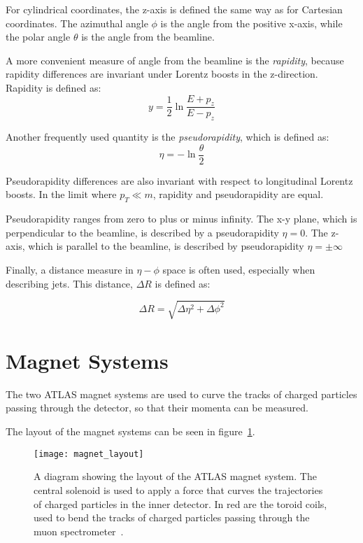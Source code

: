 For cylindrical coordinates, the z-axis is defined the same way as for
Cartesian coordinates. The azimuthal angle $\phi$ is the angle
from the positive x-axis, while the polar angle $\theta$ is the angle
from the beamline.

A more convenient measure of angle from the beamline is the
\textit{rapidity}, because rapidity differences are invariant under Lorentz boosts in the
z-direction.
Rapidity is defined as:
\begin{equation}
y = \frac{1}{2}\ln\frac{E+p_z}{E-p_z}
\end{equation}

Another frequently used quantity is the
\textit{pseudorapidity}, which is defined as:
\begin{equation}
\eta = -\ln\frac{\theta}{2}
\end{equation}

Pseudorapidity differences are also invariant with respect to
longitudinal Lorentz boosts. In the limit where $p_T \ll m$, rapidity and
pseudorapidity are equal.

Pseudorapidity ranges from zero to plus or minus infinity.
The x-y plane, which is perpendicular to the beamline, is described by a pseudorapidity $\eta=0$.
The z-axis, which is parallel to the beamline, is described by pseudorapidity $\eta=\pm\infty$

Finally, a distance measure in $\eta-\phi$ space is often used, especially when describing jets.
This distance, $\Delta R$ is defined as:

\begin{equation}
\Delta R = \sqrt{\Delta\eta^2+\Delta\phi^2}
\end{equation}

\section{Magnet Systems}\label{sec:magnet_systems}
The two ATLAS magnet systems are used to curve the tracks of charged particles passing through the detector,
so that their momenta can be measured.

The layout of the magnet systems can be seen in figure~\ref{fig:magnet_layout}.

\begin{figure}[!ht]\centering
\texttt{[image: magnet\_layout]}
\caption{A diagram showing the layout of the ATLAS magnet system.
The central solenoid is used to apply a force that curves the trajectories of charged particles in the inner detector.
In red are the toroid coils, used to bend the tracks of charged particles passing through the muon spectrometer~\cite{atlas-detector-2008}.}
\label{fig:magnet_layout}
\end{figure}

